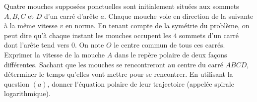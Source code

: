 \begin{Exercise}[title=Quatre mouches et un carré]
  Quatre mouches supposées ponctuelles sont initialement situées aux sommets $A, B, C$ et $D$ d'un carré d'arête $a$. Chaque mouche vole en direction de la suivante à la même vitesse $v$ en norme. En tenant compte de la symétrie du problème, on peut dire qu'à chaque instant les mouches occupent les $4$ sommets d'un carré dont l'arête tend vers $0$. On note $O$ le centre commun de tous ces carrés.
  \Question Exprimer la vitesse de la mouche $A$ dans le repère polaire de deux façons différentes.
  \Question Sachant que les mouches se rencontreront au centre du carré $ABCD$, déterminer le temps qu'elles vont mettre pour se rencontrer.
  \Question En utilisant la question $(a)$, donner l'équation polaire de leur trajectoire (appelée spirale logarithmique).
\end{Exercise}
\begin{Answer}

\end{Answer}

